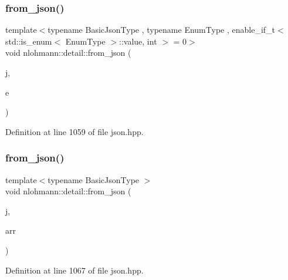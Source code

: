 \subsubsection{\texorpdfstring{from\+\_\+json()}{from\_json()}\hspace{0.1cm}{\footnotesize\ttfamily [8/18]}}
{\footnotesize\ttfamily template$<$typename Basic\+Json\+Type , typename Enum\+Type , enable\+\_\+if\+\_\+t$<$ std\+::is\+\_\+enum$<$ Enum\+Type $>$\+::value, int $>$  = 0$>$ \\
void nlohmann\+::detail\+::from\+\_\+json (\begin{DoxyParamCaption}\item[{const Basic\+Json\+Type \&}]{j,  }\item[{Enum\+Type \&}]{e }\end{DoxyParamCaption})}



Definition at line 1059 of file json.\+hpp.

\mbox{\label{namespacenlohmann_1_1detail_abc62958462b916726b89f25fa381a129}} 
\subsubsection{\texorpdfstring{from\+\_\+json()}{from\_json()}\hspace{0.1cm}{\footnotesize\ttfamily [9/18]}}
{\footnotesize\ttfamily template$<$typename Basic\+Json\+Type $>$ \\
void nlohmann\+::detail\+::from\+\_\+json (\begin{DoxyParamCaption}\item[{const Basic\+Json\+Type \&}]{j,  }\item[{typename Basic\+Json\+Type\+::array\+\_\+t \&}]{arr }\end{DoxyParamCaption})}



Definition at line 1067 of file json.\+hpp.

\mbox{\label{namespacenlohmann_1_1detail_a5cfb765aad92795abd7fda29d017272a}} 
